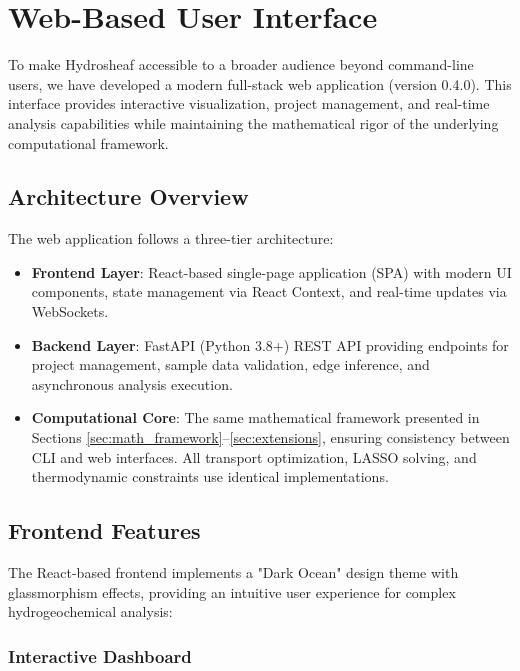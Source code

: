 
\newpage
\section{Web-Based User Interface}\label{sec:webui}

To make Hydrosheaf accessible to a broader audience beyond command-line users, we have developed a modern full-stack web application (version 0.4.0). This interface provides interactive visualization, project management, and real-time analysis capabilities while maintaining the mathematical rigor of the underlying computational framework.

\subsection{Architecture Overview}

The web application follows a three-tier architecture:

\begin{itemize}
	\item \textbf{Frontend Layer}: React-based single-page application (SPA) with modern UI components, state management via React Context, and real-time updates via WebSockets.
	\item \textbf{Backend Layer}: FastAPI (Python 3.8+) REST API providing endpoints for project management, sample data validation, edge inference, and asynchronous analysis execution.
	\item \textbf{Computational Core}: The same mathematical framework presented in Sections \ref{sec:math_framework}--\ref{sec:extensions}, ensuring consistency between CLI and web interfaces. All transport optimization, LASSO solving, and thermodynamic constraints use identical implementations.
\end{itemize}

\subsection{Frontend Features}

The React-based frontend implements a "Dark Ocean" design theme with glassmorphism effects, providing an intuitive user experience for complex hydrogeochemical analysis:

\subsubsection{Interactive Dashboard}

